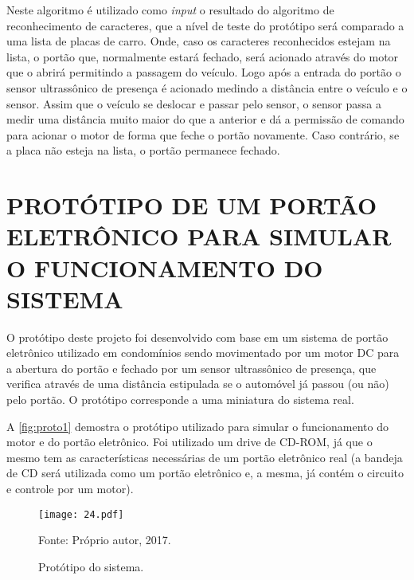 Neste algoritmo é utilizado como \textit{input} o resultado do algoritmo de reconhecimento de caracteres, que a nível de teste do protótipo será comparado a uma lista de placas de carro. Onde, caso os caracteres reconhecidos estejam na lista, o portão que, normalmente estará fechado, será acionado através do motor que o abrirá permitindo a passagem do veículo. Logo após a entrada do portão o sensor ultrassônico de presença é acionado medindo a distância entre o veículo e o sensor. Assim que o veículo se deslocar e passar pelo sensor, o sensor passa a medir uma distância muito maior do que a anterior e dá a permissão de comando para acionar o motor de forma que feche o portão novamente. Caso contrário, se a placa não esteja na lista, o portão permanece fechado.

\section{\uppercase{Protótipo de um portão eletrônico para simular o funcionamento do sistema}}

O protótipo deste projeto foi desenvolvido com base em um sistema de portão eletrônico utilizado em condomínios sendo movimentado por um motor DC para a abertura do portão e fechado por um sensor ultrassônico de presença, que verifica através de uma distância estipulada se o automóvel já passou (ou não) pelo portão. O protótipo corresponde a uma miniatura do sistema real. 

A \autoref{fig:proto1} demostra o protótipo utilizado para simular o funcionamento do motor e do portão eletrônico. Foi utilizado um drive de CD-ROM, já que o mesmo tem as características necessárias de um portão eletrônico real (a bandeja de CD será utilizada como um portão eletrônico e, a mesma, já contém o circuito e controle por um motor).

\begin{figure}[htb]
	\centering
	\caption{{\footnotesize Protótipo do sistema.}}   %
	\label{fig:proto1}
	\texttt{[image: 24.pdf]}
	
	{\footnotesize Fonte: Próprio autor, 2017.}
\end{figure}


